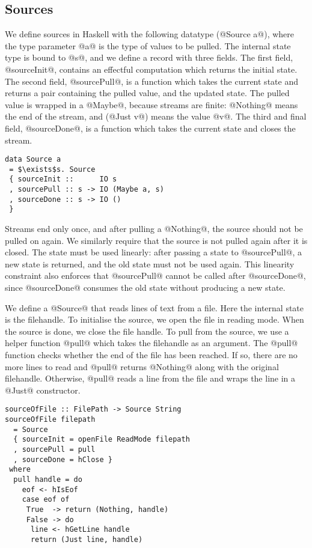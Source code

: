 \subsection{Sources}

We define sources in Haskell with the following datatype (@Source a@), where the type parameter @a@ is the type of values to be pulled.
The internal state type is bound to @s@, and we define a record with three fields.
The first field, @sourceInit@, contains an effectful computation which returns the initial state.
The second field, @sourcePull@, is a function which takes the current state and returns a pair containing the pulled value, and the updated state.
The pulled value is wrapped in a @Maybe@, because streams are finite: @Nothing@ means the end of the stream, and (@Just v@) means the value @v@.
The third and final field, @sourceDone@, is a function which takes the current state and closes the stream.

\begin{lstlisting}[mathescape=true]
data Source a
 = $\exists$s. Source
 { sourceInit ::      IO s
 , sourcePull :: s -> IO (Maybe a, s)
 , sourceDone :: s -> IO ()
 }
\end{lstlisting}

Streams end only once, and after pulling a @Nothing@, the source should not be pulled on again.
We similarly require that the source is not pulled again after it is closed.
The state must be used linearly: after passing a state to @sourcePull@, a new state is returned, and the old state must not be used again.
This linearity constraint also enforces that @sourcePull@ cannot be called after @sourceDone@, since @sourceDone@ consumes the old state without producing a new state.

We define a @Source@ that reads lines of text from a file.
Here the internal state is the filehandle.
To initialise the source, we open the file in reading mode.
When the source is done, we close the file handle.
To pull from the source, we use a helper function @pull@ which takes the filehandle as an argument.
The @pull@ function checks whether the end of the file has been reached.
If so, there are no more lines to read and @pull@ returns @Nothing@ along with the original filehandle.
Otherwise, @pull@ reads a line from the file and wraps the line in a @Just@ constructor.

\begin{lstlisting}
sourceOfFile :: FilePath -> Source String
sourceOfFile filepath
  = Source
  { sourceInit = openFile ReadMode filepath
  , sourcePull = pull
  , sourceDone = hClose }
 where
  pull handle = do
    eof <- hIsEof
    case eof of
     True  -> return (Nothing, handle)
     False -> do
      line <- hGetLine handle
      return (Just line, handle)
\end{lstlisting}

